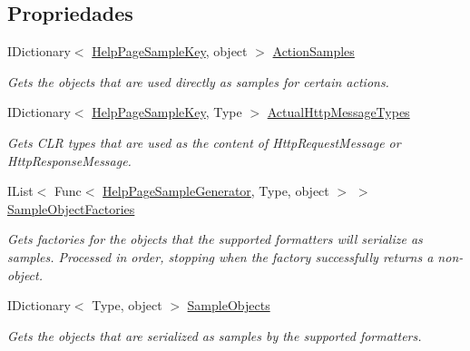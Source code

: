 \subsection*{Propriedades}
\begin{DoxyCompactItemize}
\item 
I\+Dictionary$<$ \hyperlink{classApi3Layers_1_1Areas_1_1HelpPage_1_1HelpPageSampleKey}{Help\+Page\+Sample\+Key}, object $>$ \hyperlink{classApi3Layers_1_1Areas_1_1HelpPage_1_1HelpPageSampleGenerator_aa710c187ca87cf2194303931e56088f5}{Action\+Samples}
\begin{DoxyCompactList}\small\item\em Gets the objects that are used directly as samples for certain actions. \end{DoxyCompactList}\item 
I\+Dictionary$<$ \hyperlink{classApi3Layers_1_1Areas_1_1HelpPage_1_1HelpPageSampleKey}{Help\+Page\+Sample\+Key}, Type $>$ \hyperlink{classApi3Layers_1_1Areas_1_1HelpPage_1_1HelpPageSampleGenerator_a37650c6415faa82d6ee870bbdf94c32e}{Actual\+Http\+Message\+Types}
\begin{DoxyCompactList}\small\item\em Gets C\+LR types that are used as the content of Http\+Request\+Message or Http\+Response\+Message. \end{DoxyCompactList}\item 
I\+List$<$ Func$<$ \hyperlink{classApi3Layers_1_1Areas_1_1HelpPage_1_1HelpPageSampleGenerator}{Help\+Page\+Sample\+Generator}, Type, object $>$ $>$ \hyperlink{classApi3Layers_1_1Areas_1_1HelpPage_1_1HelpPageSampleGenerator_afe79b8cfae9329d64220589984337741}{Sample\+Object\+Factories}
\begin{DoxyCompactList}\small\item\em Gets factories for the objects that the supported formatters will serialize as samples. Processed in order, stopping when the factory successfully returns a non-\/ object. \end{DoxyCompactList}\item 
I\+Dictionary$<$ Type, object $>$ \hyperlink{classApi3Layers_1_1Areas_1_1HelpPage_1_1HelpPageSampleGenerator_a74c69a35009188bdaff61af066b34aaa}{Sample\+Objects}
\begin{DoxyCompactList}\small\item\em Gets the objects that are serialized as samples by the supported formatters. \end{DoxyCompactList}\end{DoxyCompactItemize}
